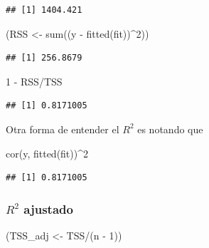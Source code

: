 \documentclass[
  12pt,
]{book}
\newenvironment{Shaded}{\begin{snugshade}}{\end{snugshade}}
\newcommand{\DecValTok}[1]{\textcolor[rgb]{0.00,0.00,0.81}{#1}}
\newcommand{\FunctionTok}[1]{\textcolor[rgb]{0.00,0.00,0.00}{#1}}
\newcommand{\NormalTok}[1]{#1}
\newcommand{\OtherTok}[1]{\textcolor[rgb]{0.56,0.35,0.01}{#1}}
\newcommand{\SpecialCharTok}[1]{\textcolor[rgb]{0.00,0.00,0.00}{#1}}
\begin{document}
\begin{verbatim}
## [1] 1404.421
\end{verbatim}

\begin{Shaded}
\begin{Highlighting}[]
\NormalTok{(RSS }\OtherTok{\textless{}{-}} \FunctionTok{sum}\NormalTok{((y }\SpecialCharTok{{-}} \FunctionTok{fitted}\NormalTok{(fit))}\SpecialCharTok{\^{}}\DecValTok{2}\NormalTok{))}
\end{Highlighting}
\end{Shaded}

\begin{verbatim}
## [1] 256.8679
\end{verbatim}

\begin{Shaded}
\begin{Highlighting}[]
\DecValTok{1} \SpecialCharTok{{-}}\NormalTok{ RSS}\SpecialCharTok{/}\NormalTok{TSS}
\end{Highlighting}
\end{Shaded}

\begin{verbatim}
## [1] 0.8171005
\end{verbatim}

Otra forma de entender el \(R^2\) es notando que

\begin{Shaded}
\begin{Highlighting}[]
\FunctionTok{cor}\NormalTok{(y, }\FunctionTok{fitted}\NormalTok{(fit))}\SpecialCharTok{\^{}}\DecValTok{2}
\end{Highlighting}
\end{Shaded}

\begin{verbatim}
## [1] 0.8171005
\end{verbatim}

\hypertarget{r2-ajustado}{%
\subsubsection{\texorpdfstring{\(R^2\)
ajustado}{R\^{}2 ajustado}}\label{r2-ajustado}}

\begin{Shaded}
\begin{Highlighting}[]
\NormalTok{(TSS\_adj }\OtherTok{\textless{}{-}}\NormalTok{ TSS}\SpecialCharTok{/}\NormalTok{(n }\SpecialCharTok{{-}} \DecValTok{1}\NormalTok{))}
\end{Highlighting}
\end{Shaded}
\end{document}
